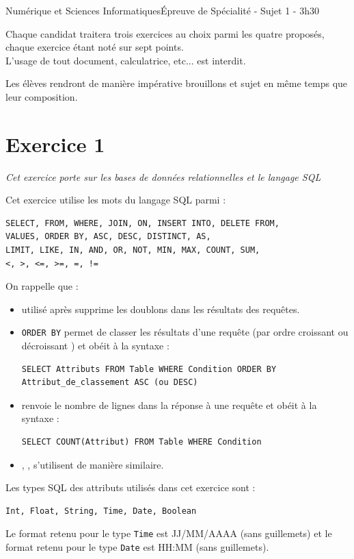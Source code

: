 \documentclass[11pt,a4paper,french,twoside]{PMCours}
\begin{document}
{Numérique et Sciences Informatiques}{Épreuve de Spécialité - Sujet 1 - 3h30}

\medskip
{\large Chaque candidat traitera trois exercices au choix parmi les quatre proposés, chaque exercice étant noté sur sept points.\medskip\\
L'usage de tout document, calculatrice, etc... est interdit.

\medskip
Les élèves rendront de manière impérative brouillons et sujet en même temps que leur composition.}

\newpage
\section*{Exercice 1}
\emph{Cet exercice porte sur les bases de données relationnelles et le langage SQL}

\medskip
Cet exercice utilise les mots du langage SQL parmi :
\begin{verbatim}
SELECT, FROM, WHERE, JOIN, ON, INSERT INTO, DELETE FROM, 
VALUES, ORDER BY, ASC, DESC, DISTINCT, AS,
LIMIT, LIKE, IN, AND, OR, NOT, MIN, MAX, COUNT, SUM,
<, >, <=, >=, =, !=
\end{verbatim} 

\medskip
On rappelle que :
\begin{itemize}
\item {} utilisé après  supprime les doublons dans les résultats des requêtes.
\item \verb'ORDER BY' permet de classer les résultats d'une requête (par ordre croissant  ou décroissant ) et obéit à la syntaxe : 
\begin{verbatim}
SELECT Attributs FROM Table WHERE Condition ORDER BY Attribut_de_classement ASC (ou DESC)
\end{verbatim}
\item {} renvoie le nombre de lignes dans la réponse à une requête et obéit à la syntaxe :
\begin{verbatim}
SELECT COUNT(Attribut) FROM Table WHERE Condition
\end{verbatim}
\item {}, ,  s'utilisent de manière similaire.
\end{itemize}

\medskip
Les types SQL des attributs utilisés dans cet exercice sont : 
\begin{verbatim}
Int, Float, String, Time, Date, Boolean
\end{verbatim} 
Le format retenu pour le type \verb'Time' est JJ/MM/AAAA (sans guillemets) et 
le format retenu pour le type \verb'Date' est HH:MM (sans guillemets).
\end{document}
